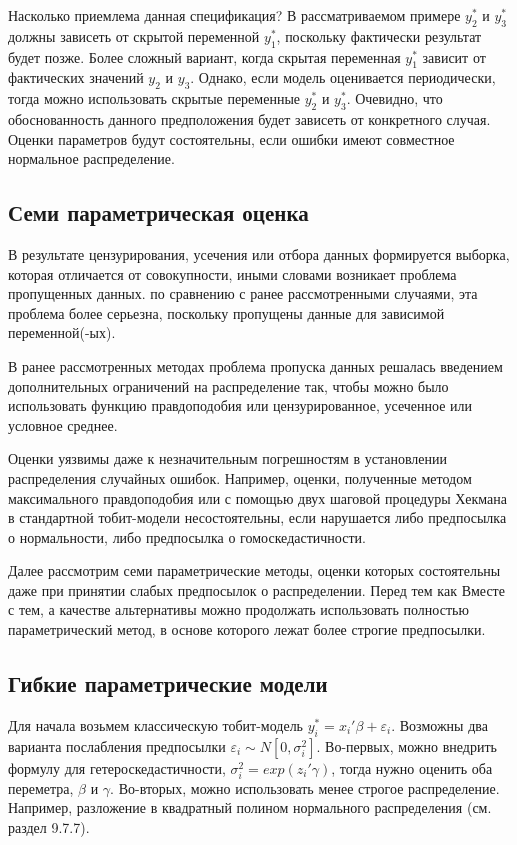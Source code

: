 Насколько приемлема данная спецификация? В рассматриваемом примере $y_2^{*}$ и $y_3^{*}$ должны зависеть от скрытой переменной $y_1^{*}$, поскольку фактически результат будет позже. Более сложный вариант, когда скрытая переменная $y_1^{*}$ зависит от фактических значений $y_2$ и $y_3$. Однако, если модель оценивается периодически, тогда можно использовать скрытые переменные $y_2^{*}$ и $y_3^{*}$. Очевидно, что обоснованность данного предположения будет зависеть от конкретного случая. Оценки параметров будут состоятельны, если ошибки имеют совместное нормальное распределение.

\subsection{Семи параметрическая оценка}

В результате цензурирования, усечения или отбора данных формируется выборка, которая отличается от совокупности, иными словами возникает проблема пропущенных данных. по сравнению с ранее рассмотренными случаями, эта проблема более серьезна, поскольку пропущены данные для зависимой переменной(-ых).

В ранее рассмотренных методах проблема пропуска данных решалась введением дополнительных ограничений на распределение так, чтобы можно было использовать функцию правдоподобия или цензурированное, усеченное или условное среднее.

Оценки уязвимы даже к незначительным погрешностям в установлении распределения случайных ошибок. Например, оценки, полученные методом максимального правдоподобия или с помощью двух шаговой процедуры Хекмана в стандартной тобит-модели несостоятельны, если нарушается либо предпосылка о нормальности, либо предпосылка о гомоскедастичности. 

Далее рассмотрим семи параметрические методы, оценки которых состоятельны даже при принятии слабых предпосылок о распределении. Перед тем как Вместе с тем, а качестве альтернативы можно продолжать использовать полностью параметрический метод, в основе которого лежат более строгие предпосылки.

\subsection{Гибкие параметрические модели}

Для начала возьмем классическую тобит-модель $y_i^{*}=x_i'\beta+\varepsilon_i$. Возможны два варианта послабления предпосылки $\varepsilon_i{\sim}N[0,\sigma_i^2]$. Во-первых, можно внедрить формулу для гетероскедастичности, $\sigma_i^2=exp(z_i'\gamma)$, тогда нужно оценить оба переметра, $\beta$ и $\gamma$. Во-вторых, можно использовать менее строгое распределение. Например, разложение в квадратный полином нормального распределения (см. раздел 9.7.7).

